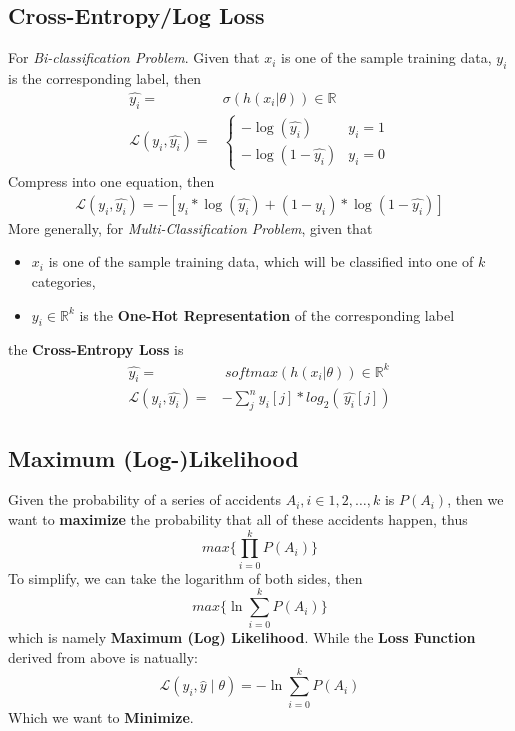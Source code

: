 \documentclass{article}
\begin{document}
    \subsection{Cross-Entropy/Log Loss}
    For \emph{Bi-classification Problem}. Given that $x_i$ is one of the sample training data, $y_i$ is the corresponding label, then
    \begin{align*}
        \hat{y_i} =&\sigma(h(x_i| \theta)) \in \mathbb{R}\\
        \mathcal{L}(y_i,\hat{y_i}) =& \begin{cases}
            -\log(\hat{y_i}) & y_i = 1\\
            -\log(1-\hat{y_i}) & y_i = 0
        \end{cases}
    \end{align*}
    Compress into one equation, then
    \begin{gather*}
        \mathcal{L}(y_i,\hat{y_i}) = -[y_i *\log(\hat{y_i}) + (1-y_i)*\log(1-\hat{y_i})]
    \end{gather*}
    More generally, for \emph{Multi-Classification Problem}, given that \begin{itemize}
        \item $x_i$ is one of the sample training data, which will be classified into one of $k$ categories,
        \item $y_i \in \mathbb{R}^k$ is the \textbf{One-Hot Representation} of the corresponding label
    \end{itemize}
    the \textbf{Cross-Entropy Loss} is
    \begin{align*}
        \hat{y_i} =&  \ softmax(h(x_i| \theta)) \in \mathbb{R}^k\\
        \mathcal{L}(y_i,\hat{y_i}) =& -\sum_j^n y_i[j] * log_2(\, \hat{y_i}[j])
    \end{align*} 

    \subsection{Maximum (Log-)Likelihood}
    Given the probability of a series of accidents $A_i,i\in{1,2,\dots,k}$ is $P(A_i)$, then we want to \textbf{maximize} the probability
    that all of these accidents happen, thus
    \begin{equation*}
        max\{\prod_{i=0}^{k}P(A_i)\}
    \end{equation*}
    To simplify, we can take the logarithm of both sides, then
    \begin{equation*}
        max\{\ln{\sum_{i=0}^kP(A_i)}\}
    \end{equation*}
    which is namely \textbf{Maximum (Log) Likelihood}. While the \textbf{Loss Function} derived from above is natually:
    \begin{equation*}
        \mathcal{L}(y_i,\hat{y}\mid \theta) = -\ln{\sum_{i=0}^kP(A_i)}
    \end{equation*}
    Which we want to \textbf{Minimize}.
\end{document}
